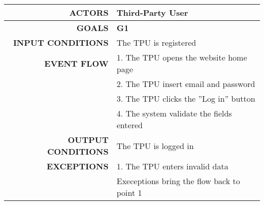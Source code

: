\begin{table}[h!]
\begin{tabular}{|r|p{3in}|}
\hline
\textbf{ACTORS} & Third-Party User\\
\hline
\textbf{GOALS} & \textbf{G1}\\
\hline
\textbf{INPUT CONDITIONS} & The TPU is registered\\
\hline
\textbf{EVENT FLOW} 
&1. The TPU opens the website home page\\
&2. The TPU insert email and password\\
&3. The TPU clicks the ''Log in'' button\\
&4. The system validate the fields entered\\
\hline
\textbf{OUTPUT CONDITIONS} & The TPU is logged in \\
\hline
\textbf{EXCEPTIONS} 
&1. The TPU enters invalid data  \\
&Execeptions bring the flow back to point 1\\
\hline
\end{tabular}
\end{table}